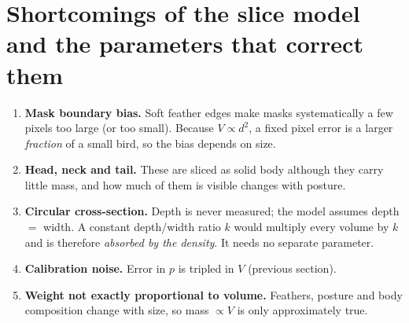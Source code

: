 \documentclass[11pt,a4paper]{article}
\begin{document}
\section{Shortcomings of the slice model and the parameters that correct them}
\begin{enumerate}[leftmargin=*]
  \item \textbf{Mask boundary bias.} Soft feather edges make masks systematically a few pixels too large (or too small). Because $V\propto d^{2}$, a fixed pixel error is a larger \emph{fraction} of a small bird, so the bias depends on size.
  \item \textbf{Head, neck and tail.} These are sliced as solid body although they carry little mass, and how much of them is visible changes with posture.
  \item \textbf{Circular cross-section.} Depth is never measured; the model assumes depth $=$ width. A constant depth/width ratio $k$ would multiply every volume by $k$ and is therefore \emph{absorbed by the density}. It needs no separate parameter.
  \item \textbf{Calibration noise.} Error in $p$ is tripled in $V$ (previous section).
  \item \textbf{Weight not exactly proportional to volume.} Feathers, posture and body composition change with size, so mass $\propto V$ is only approximately true.
\end{enumerate}
\end{document}
